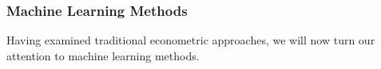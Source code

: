 \begin{frame}
    \frametitle{Machine Learning Methods}
\begin{center}
Having examined traditional econometric approaches, we will now turn our attention to machine learning methods.
\end{center}
\end{frame}